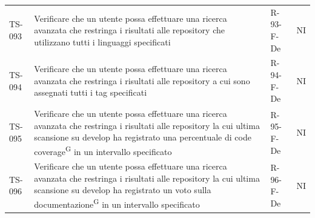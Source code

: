 \documentclass[a4paper, 11pt]{article}
\begin{document}
\begin{longtable}{>{\centering\arraybackslash}m{1.4cm} >{\raggedright\arraybackslash}p{7.2cm} >{\centering\arraybackslash}m{2.5cm} >{\centering\arraybackslash}m{2.2cm}}
TS-093 & Verificare che un utente possa effettuare una ricerca avanzata che restringa i risultati alle repository che utilizzano tutti i linguaggi specificati & R-93-F-De & NI \\
TS-094 & Verificare che un utente possa effettuare una ricerca avanzata che restringa i risultati alle repository a cui sono assegnati tutti i tag specificati & R-94-F-De & NI \\
TS-095 & Verificare che un utente possa effettuare una ricerca avanzata che restringa i risultati alle repository la cui ultima scansione su develop ha registrato una percentuale di code coverage\textsuperscript{G} in un intervallo specificato & R-95-F-De & NI \\
TS-096 & Verificare che un utente possa effettuare una ricerca avanzata che restringa i risultati alle repository la cui ultima scansione su develop ha registrato un voto sulla documentazione\textsuperscript{G} in un intervallo specificato & R-96-F-De & NI \\


\end{longtable}
\end{document}
